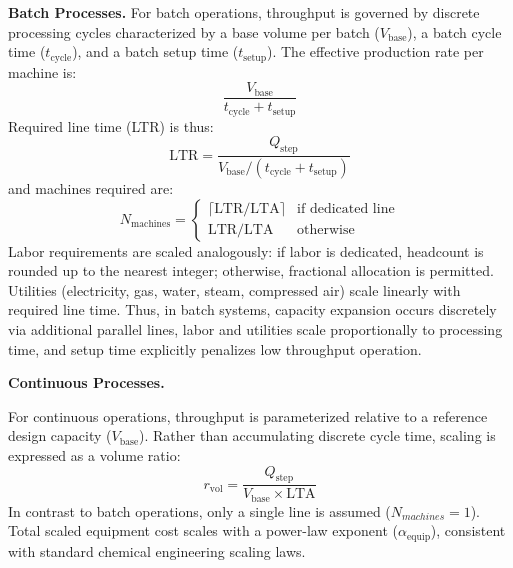 \noindent\textbf{Batch Processes.}\quad
For batch operations, throughput is governed by discrete processing cycles characterized by a base volume per batch ($V_{\text{base}}$), a batch cycle time ($t_{\text{cycle}}$), and a batch setup time ($t_{\text{setup}}$). The effective production rate per machine is:
\begin{equation}
    \frac{V_{\text{base}}}{t_{\text{cycle}} + t_{\text{setup}}}
\end{equation}
\alteqend
Required line time (LTR) is thus:
\begin{equation}
    \text{LTR} = \frac{Q_{\text{step}}}{V_{\text{base}} / (t_{\text{cycle}} + t_{\text{setup}})}
\end{equation}
\alteqend
and machines required are:
\begin{equation}
    N_{\text{machines}} = 
    \begin{cases}
        \lceil \text{LTR} / \text{LTA} \rceil & \text{if dedicated line} \\
        \text{LTR} / \text{LTA} & \text{otherwise}
    \end{cases}
\end{equation}
\alteqend
Labor requirements are scaled analogously: if labor is dedicated, headcount is rounded up to the nearest integer; otherwise, fractional allocation is permitted. Utilities (electricity, gas, water, steam, compressed air) scale linearly with required line time. Thus, in batch systems, capacity expansion occurs discretely via additional parallel lines, labor and utilities scale proportionally to processing time, and setup time explicitly penalizes low throughput operation.

\medskip
\noindent\textbf{Continuous Processes.}\quad

For continuous operations, throughput is parameterized relative to a reference design capacity ($V_{\text{base}}$). Rather than accumulating discrete cycle time, scaling is expressed as a volume ratio:
\begin{equation}
    r_{\text{vol}} = \frac{Q_{\text{step}}}{V_{\text{base}} \times \text{LTA}}
\end{equation}
\alteqend
In contrast to batch operations, only a single line is assumed ($N_{machines} = 1$). Total scaled equipment cost scales with a power-law exponent ($\alpha_{\text{equip}}$), consistent with standard chemical engineering scaling laws. 

